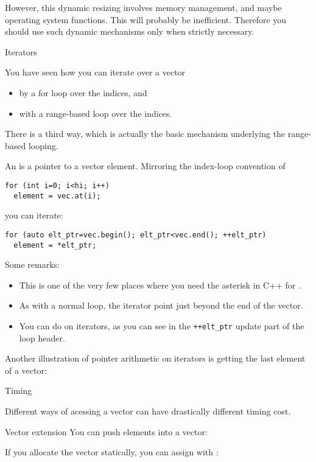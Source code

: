 However, this dynamic resizing involves memory management, and maybe
operating system functions. This will probably be
inefficient. Therefore you should use such dynamic mechanisms only
when strictly necessary.

 {Iterators}
\label{sec:iterator}

You have seen how you can iterate over a vector
\begin{itemize}
\item by a for loop over the indices, and
\item with a range-based loop over the indices.
\end{itemize}
There is a third way, which is actually the basic mechanism underlying
the range-based looping.

An  is a pointer to a vector element. Mirroring
the index-loop convention of
\begin{verbatim}
for (int i=0; i<hi; i++)
  element = vec.at(i);
\end{verbatim}
you can iterate:
\begin{verbatim}
for (auto elt_ptr=vec.begin(); elt_ptr<vec.end(); ++elt_ptr)
  element = *elt_ptr;
\end{verbatim}
Some remarks:
\begin{itemize}
\item This is one of the very few places where you need the asterisk in C++
  for .
\item As with a normal loop, the  iterator point just beyond the end
  of the vector.
\item You can do  on iterators, as
  you can see in the \verb-++elt_ptr- update part of the loop header.
\end{itemize}
Another illustration of pointer arithmetic on iterators is getting the
last element of a vector:
%

 {Timing}

Different ways of acessing a vector can have drastically different
timing cost.

\begin{block}{Vector extension}
  \label{sl:vect-extend-code}
  You can push elements into a vector:

  If you allocate the vector statically, you can assign with :
\end{block}

